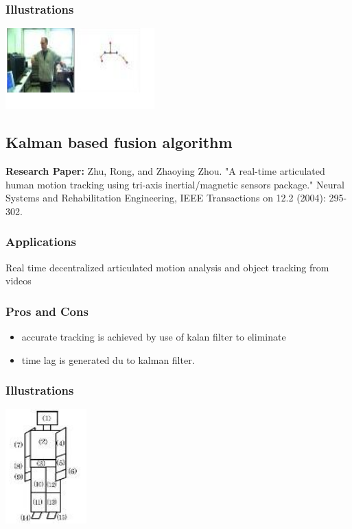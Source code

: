 \documentclass[a4paper,10pt]{report}
\begin{document}
\subsubsection{Illustrations}\newline\newline
\includegraphics{./skeltrack6.png}
\newline \newline

\subsection{Kalman based fusion algorithm}
\textbf{Research Paper:} Zhu, Rong, and Zhaoying Zhou. "A real-time articulated human motion tracking using tri-axis inertial/magnetic sensors package." Neural Systems and Rehabilitation Engineering, IEEE Transactions on 12.2 (2004): 295-302.
\subsubsection{Applications}
Real time decentralized articulated motion analysis and object tracking from videos
\subsubsection{Pros and Cons}
\begin{itemize}
 \item accurate tracking is achieved by use of kalan filter to eliminate
 \item time lag is generated du to kalman filter.
\end{itemize}
\subsubsection{Illustrations}\newline\newline
\includegraphics{./skeltrack7.png}
\newline \newline
\end{document}
